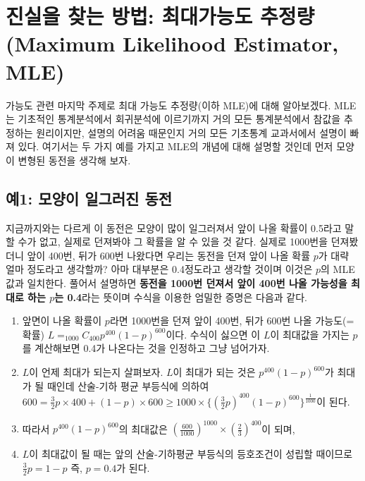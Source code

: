 \documentclass[]{book}
\providecommand{\tightlist}{%
  \setlength{\itemsep}{0pt}\setlength{\parskip}{0pt}}
\begin{document}
\hypertarget{uxc9c4uxc2e4uxc744-uxcc3euxb294-uxbc29uxbc95-uxcd5cuxb300uxac00uxb2a5uxb3c4-uxcd94uxc815uxb7c9maximum-likelihood-estimator-mle}{%
\section{진실을 찾는 방법: 최대가능도 추정량(Maximum Likelihood Estimator, MLE)}\label{uxc9c4uxc2e4uxc744-uxcc3euxb294-uxbc29uxbc95-uxcd5cuxb300uxac00uxb2a5uxb3c4-uxcd94uxc815uxb7c9maximum-likelihood-estimator-mle}}

가능도 관련 마지막 주제로 최대 가능도 추정량(이하 MLE)에 대해 알아보겠다. MLE는 기초적인 통계분석에서 회귀분석에 이르기까지 거의 모든 통계분석에서 참값을 추정하는 원리이지만, 설명의 어려움 때문인지 거의 모든 기초통계 교과서에서 설명이 빠져 있다. 여기서는 두 가지 예를 가지고 MLE의 개념에 대해 설명할 것인데 먼저 모양이 변형된 동전을 생각해 보자.

\hypertarget{uxc6081-uxbaa8uxc591uxc774-uxc77cuxadf8uxb7ecuxc9c4-uxb3d9uxc804}{%
\subsection{예1: 모양이 일그러진 동전}\label{uxc6081-uxbaa8uxc591uxc774-uxc77cuxadf8uxb7ecuxc9c4-uxb3d9uxc804}}

지금까지와는 다르게 이 동전은 모양이 많이 일그러져서 앞이 나올 확률이 0.5라고 말할 수가 없고, 실제로 던져봐야 그 확률을 알 수 있을 것 같다. 실제로 1000번을 던져봤더니 앞이 400번, 뒤가 600번 나왔다면 우리는 동전을 던져 앞이 나올 확률 \(p\)가 대략 얼마 정도라고 생각할까? 아마 대부분은 0.4정도라고 생각할 것이며 이것은 \(p\)의 MLE값과 일치한다. 풀어서 설명하면 \textbf{동전을 1000번 던져서 앞이 400번 나올 가능성을 최대로 하는 \(p\)는 0.4}라는 뜻이며 수식을 이용한 엄밀한 증명은 다음과 같다.

\begin{enumerate}
\def\labelenumi{\arabic{enumi}.}
\tightlist
\item
  앞면이 나올 확률이 \(p\)라면 1000번을 던져 앞이 400번, 뒤가 600번 나올 가능도(=확률) \(L=_{1000} C_{400}p^{400}(1-p)^{600}\)이다. 수식이 싫으면 이 \(L\)이 최대값을 가지는 \(p\)를 계산해보면 0.4가 나온다는 것을 인정하고 그냥 넘어가자.
\item
  \(L\)이 언제 최대가 되는지 살펴보자. \(L\)이 최대가 되는 것은 \(p^{400}(1-p)^{600}\)가 최대가 될 때인데 산술-기하 평균 부등식에 의하여 \(600= \frac{3}{2}p\times 400 + (1-p)\times 600 \ge 1000\times \{(\frac{3}{2}p)^{400}(1-p)^{600}\}^{\frac{1}{1000}}\)이 된다.\\
\item
  따라서 \(p^{400}(1-p)^{600}\)의 최대값은 \((\frac{600}{1000})^{1000} \times (\frac{2}{3})^{400}\)이 되며,
\item
  \(L\)이 최대값이 될 때는 앞의 산술-기하평균 부등식의 등호조건이 성립할 때이므로 \(\frac{3}{2}p=1-p\) 즉, \(p=0.4\)가 된다.
\end{enumerate}
\end{document}
